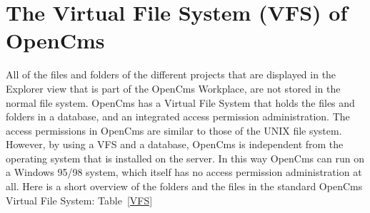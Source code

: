 \section{The Virtual File System (VFS) of OpenCms}
All of the files and folders of the different projects that are
displayed in the Explorer view that is part of the OpenCms Workplace,
are not stored in the normal file system. OpenCms has a {\name Virtual File
System} that holds the files and folders in a database, and an integrated
access permission administration. The access permissions in OpenCms are
similar to those of the UNIX file system. However, by using a {\name VFS} and a
database, OpenCms is independent from the operating system that is
installed on the server. In this way OpenCms can run on a Windows 95/98
system, which itself has no access permission administration at all.
Here is a short overview of the folders and the files in the standard
OpenCms {\name Virtual File System:} {Table~\ref {VFS}}


